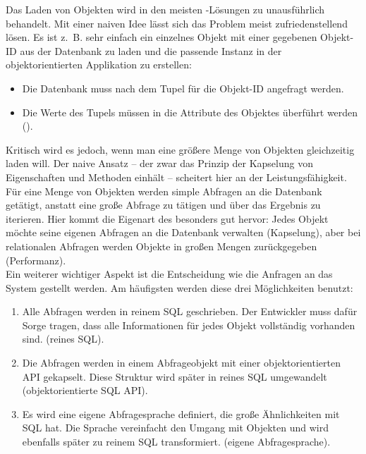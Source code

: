 Das Laden von Objekten wird in den meisten \ORM-Lösungen zu unausführlich behandelt. Mit einer naiven Idee lässt sich das Problem meist zufriedenstellend lösen. Es ist z.~B. sehr einfach ein einzelnes Objekt mit einer gegebenen Objekt-ID aus der Datenbank zu laden und die passende Instanz in der objektorientierten Applikation zu erstellen:
\begin{itemize}
\item Die Datenbank muss nach dem Tupel für die Objekt-ID angefragt werden.
\item Die Werte des Tupels müssen in die Attribute des Objektes überführt werden ().
\end{itemize}
Kritisch wird es jedoch, wenn man eine größere Menge von Objekten gleichzeitig laden will. Der naive Ansatz -- der zwar das Prinzip der Kapselung von Eigenschaften und Methoden einhält -- scheitert hier an der Leistungsfähigkeit. Für eine Menge von  Objekten werden  simple Abfragen an die Datenbank getätigt, anstatt eine große Abfrage zu tätigen und über das Ergebnis zu iterieren. Hier kommt die Eigenart des \IM besonders gut hervor: Jedes Objekt möchte seine eigenen Abfragen an die Datenbank verwalten (Kapselung), aber bei relationalen Abfragen werden Objekte in großen Mengen zurückgegeben (Performanz).\\
Ein weiterer wichtiger Aspekt ist die Entscheidung wie die Anfragen an das System gestellt werden. Am häufigsten werden diese drei Möglichkeiten benutzt:
\begin{enumerate}
\item Alle Abfragen werden in reinem SQL geschrieben. Der Entwickler muss dafür Sorge tragen, dass alle Informationen für jedes Objekt vollständig vorhanden sind. (reines SQL).
\item Die Abfragen werden in einem Abfrageobjekt mit einer objektorientierten API gekapselt. Diese Struktur wird später in reines SQL umgewandelt (objektorientierte SQL API).
\item Es wird eine eigene Abfragesprache definiert, die große Ähnlichkeiten mit SQL hat. Die Sprache vereinfacht den Umgang mit Objekten und wird ebenfalls später zu reinem SQL transformiert. (eigene Abfragesprache).
\end{enumerate}
